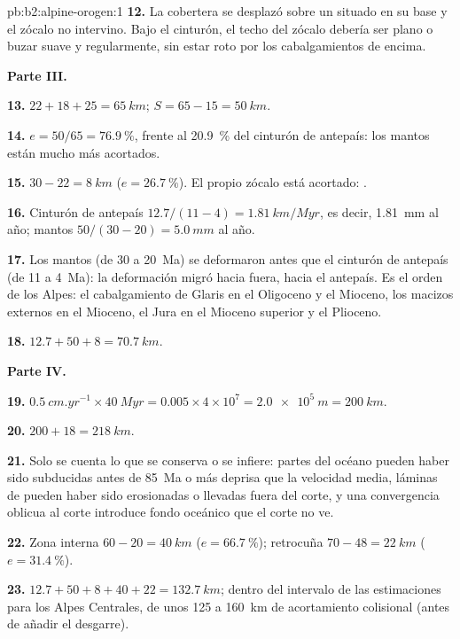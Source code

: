 \begin{solution}{pb:b2:alpine-orogen:1}
\textbf{12.} La cobertera se desplazó sobre un  situado en su base y el zócalo no
intervino. Bajo el cinturón, el techo del zócalo debería ser plano o buzar suave y
regularmente, sin estar roto por los cabalgamientos de encima.

\noindent\textbf{Parte III.}

\textbf{13.} $22 + 18 + 25 = \qty{65}{km}$; $S = 65 - 15 = \qty{50}{km}$.

\textbf{14.} $e = 50/65 = \qty{76.9}{\percent}$, frente al \qty{20.9}{\percent} del
cinturón de antepaís: los mantos están mucho más acortados.

\textbf{15.} $30 - 22 = \qty{8}{km}$ ($e = \qty{26.7}{\percent}$). El propio zócalo está
acortado: .

\textbf{16.} Cinturón de antepaís $12.7/(11 - 4) = \qty{1.81}{km/Myr}$, es decir,
\qty{1.81}{mm} al año; mantos $50/(30 - 20) = \qty{5.0}{mm}$ al año.

\textbf{17.} Los mantos (de 30 a \qty{20}{Ma}) se deformaron antes que el cinturón de antepaís (de 11 a
\qty{4}{Ma}): la deformación migró hacia fuera, hacia el antepaís. Es el orden de los
Alpes: el cabalgamiento de Glaris en el Oligoceno y el Mioceno, los macizos externos en el Mioceno,
el Jura en el Mioceno superior y el Plioceno.

\textbf{18.} $12.7 + 50 + 8 = \qty{70.7}{km}$.

\noindent\textbf{Parte IV.}

\textbf{19.} $\qty{0.5}{cm.yr^{-1}}\times\qty{40}{Myr} = 0.005\times4\times10^7 =
\qty{2.0e5}{m} = \qty{200}{km}$.

\textbf{20.} $200 + 18 = \qty{218}{km}$.

\textbf{21.} Solo se cuenta lo que se conserva o se infiere: partes del océano pueden haber
sido subducidas antes de \qty{85}{Ma} o más deprisa que la velocidad media, láminas de  pueden haber
sido erosionadas o llevadas fuera del corte, y una convergencia oblicua al corte introduce
fondo oceánico que el corte no ve.

\textbf{22.} Zona interna $60 - 20 = \qty{40}{km}$ ($e = \qty{66.7}{\percent}$); retrocuña
$70 - 48 = \qty{22}{km}$ ($e = \qty{31.4}{\percent}$).

\textbf{23.} $12.7 + 50 + 8 + 40 + 22 = \qty{132.7}{km}$; dentro del intervalo de las estimaciones
para los Alpes Centrales, de unos 125 a \qty{160}{km} de acortamiento colisional (antes de añadir
el desgarre).


\end{solution}
